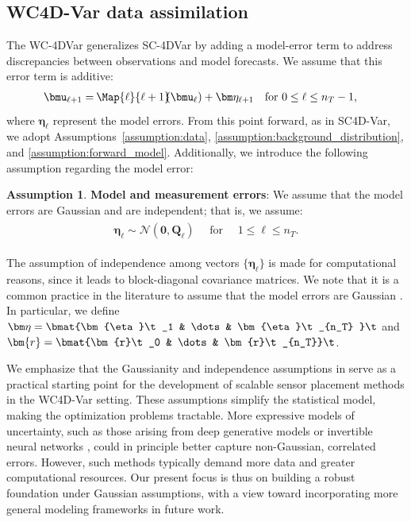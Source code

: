 \documentclass{aims} %
\theoremstyle{definition}
\newtheorem{assumption}{Assumption}
\begin{document}
\subsection{WC4D-Var data assimilation}\label{ssec:wc4d-var}
The WC-4DVar generalizes SC-4DVar by adding a model-error term to address discrepancies between observations and model forecasts. We assume that this error term is additive:
%
%
\begin{equation}
\begin{aligned}
    \bmu_{\ell+1} = & \> \Map{\ell}{{\ell+1}}\!\!(\bmu_\ell) + \bm\eta_{\ell+1} && \mbox{for } 0 \leq \ell \leq n_T-1,
\end{aligned} \label{eq:WC_system}
\end{equation}
%
where $\bm\eta_{\ell}$ represent the model errors.
% 
From this point forward, as in SC4D-Var, we adopt Assumptions~\ref{assumption:data}, \ref{assumption:background_distribution}, and \ref{assumption:forward_model}. Additionally, we introduce the following assumption regarding the model error:
%
\begin{assumption}\label{assumption:model_measurement_error}
\textbf{Model and measurement errors}: We assume that the  model errors are Gaussian and are independent; that is, we assume: 
 \begin{align}
\begin{aligned}
\bm \eta_{\ell}  \sim 
\mathcal{N}(\bm 0,\bm Q_{\ell}) \quad  \mbox{ for }  \quad 1 \leq \ell \leq n_T. 
\end{aligned}\label{def:noise_assumptions}
\end{align}
\end{assumption}
The assumption of independence among vectors $\{\bm{\eta}_\ell\}$ is made for computational reasons, since it leads to block-diagonal covariance matrices.  We note that it is a common practice in the literature to assume that the model errors are Gaussian \cite{carrassi2018data, fisher2011weak}.
%
In particular, we define $\bm\eta = \bmat{\bm{\eta}\t_1 & \dots & \bm{\eta}\t_{n_T} }\t$ 
and $\bm{r} = \bmat{\bm{r}\t_0 & \dots & \bm{r}\t_{n_T}}\t$.

We emphasize that the Gaussianity and independence assumptions in  serve as a practical starting point for the development of scalable sensor placement methods in the WC4D-Var setting. These assumptions simplify the statistical model, making the optimization problems tractable. 
More expressive models of uncertainty, such as those arising from deep generative models or invertible neural networks \cite{pmlr-v97-behrmann19a}, could in principle better capture non-Gaussian, correlated errors. However, such methods typically demand more data and greater computational resources. Our present focus is thus on building a robust foundation under Gaussian assumptions, with a view toward incorporating more general modeling frameworks in future work.
\end{document}
